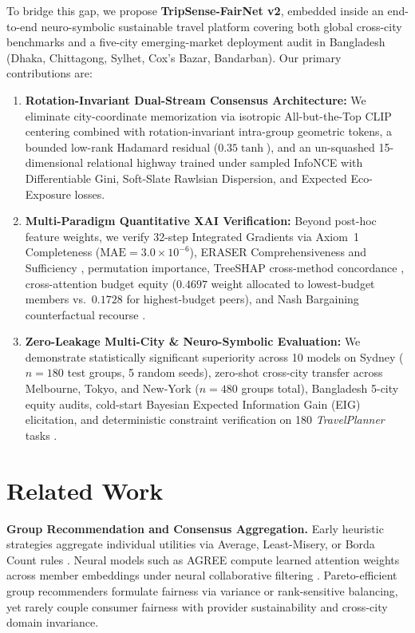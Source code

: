 \documentclass[preprint,12pt]{elsarticle}
\begin{document}
To bridge this gap, we propose \textbf{TripSense-FairNet v2}, embedded inside an end-to-end neuro-symbolic sustainable travel platform covering both global cross-city benchmarks and a five-city emerging-market deployment audit in Bangladesh (Dhaka, Chittagong, Sylhet, Cox's Bazar, Bandarban). Our primary contributions are:
\begin{enumerate}
    \item \textbf{Rotation-Invariant Dual-Stream Consensus Architecture:} We eliminate city-coordinate memorization via isotropic All-but-the-Top CLIP centering \cite{mu2018all} combined with rotation-invariant intra-group geometric tokens, a bounded low-rank Hadamard residual ($0.35\tanh$), and an un-squashed 15-dimensional relational highway trained under sampled InfoNCE with Differentiable Gini, Soft-Slate Rawlsian Dispersion, and Expected Eco-Exposure losses.
    \item \textbf{Multi-Paradigm Quantitative XAI Verification:} Beyond post-hoc feature weights, we verify 32-step Integrated Gradients \cite{sundararajan2017axiomatic} via Axiom~1 Completeness ($\text{MAE} = 3.0 \times 10^{-6}$), ERASER Comprehensiveness and Sufficiency \cite{deyoung2020eraser}, permutation importance, TreeSHAP cross-method concordance \cite{lundberg2017unified}, cross-attention budget equity ($0.4697$ weight allocated to lowest-budget members vs.\ $0.1728$ for highest-budget peers), and Nash Bargaining counterfactual recourse \cite{nash1950bargaining}.
    \item \textbf{Zero-Leakage Multi-City & Neuro-Symbolic Evaluation:} We demonstrate statistically significant superiority across 10 models on Sydney ($n{=}180$ test groups, 5 random seeds), zero-shot cross-city transfer across Melbourne, Tokyo, and New-York ($n{=}480$ groups total), Bangladesh 5-city equity audits, cold-start Bayesian Expected Information Gain (EIG) elicitation, and deterministic constraint verification on 180 \textit{TravelPlanner} tasks \cite{xie2024travelplanner}.
\end{enumerate}

\section{Related Work}
\textbf{Group Recommendation and Consensus Aggregation.} Early heuristic strategies aggregate individual utilities via Average, Least-Misery, or Borda Count rules \cite{masthoff2015group}. Neural models such as AGREE \cite{cao2018attentive} compute learned attention weights across member embeddings under neural collaborative filtering \cite{he2017neural}. Pareto-efficient group recommenders \cite{xiao2017fairness,kaya2020ensuring} formulate fairness via variance or rank-sensitive balancing, yet rarely couple consumer fairness with provider sustainability and cross-city domain invariance.
\end{document}
